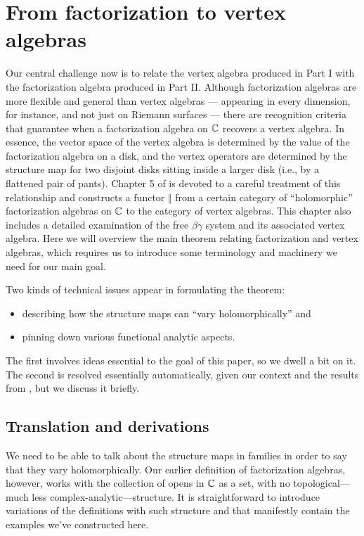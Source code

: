 \section{From factorization to vertex algebras}

Our central challenge now is to relate the vertex algebra produced in Part I with the factorization algebra produced in Part II.
Although factorization algebras are more flexible and general than vertex algebras
--- appearing in every dimension, for instance, and not just on Riemann surfaces --- 
there are recognition criteria that guarantee when a factorization algebra on $\mathbb C$ recovers a vertex algebra.
In essence, the vector space of the vertex algebra is determined by the value of the factorization algebra on a disk,
and the vertex operators are determined by the structure map for two disjoint disks sitting inside a larger disk (i.e., by a flattened pair of pants).
Chapter 5 of \cite{CG1} is devoted to a careful treatment of this relationship 
and constructs a functor $\Vert$ from a certain category of ``holomorphic'' factorization algebras on $\mathbb C$ to the category of vertex algebras.
This chapter also includes a detailed examination of the free $\beta\gamma$ system and its associated vertex algebra.
Here we will overview the main theorem relating factorization and vertex algebras, 
which requires us to introduce some terminology and machinery we need for our main goal.

Two kinds of technical issues appear in formulating the theorem:
\begin{itemize}
\item describing how the structure maps can ``vary holomorphically'' and
\item pinning down various functional analytic aspects.
\end{itemize}
The first involves ideas essential to the goal of this paper, so we dwell a bit on it.
The second is resolved essentially automatically, given our context and the results from \cite{CG1},
but we discuss it briefly.

\subsection{Translation and derivations}

We need to be able to talk about the structure maps in families in order to say that they vary holomorphically.
Our earlier definition of factorization algebras, however, works with the collection of opens in $\mathbb C$ as a set, 
with no topological---much less complex-analytic---structure.
It is straightforward to introduce variations of the definitions with such structure and 
that manifestly contain the examples we've constructed here.

